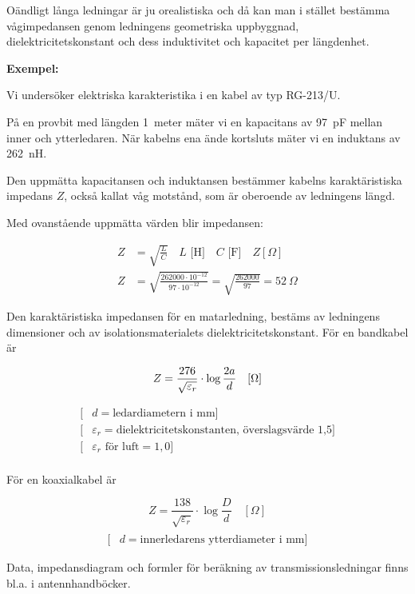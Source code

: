 Oändligt långa ledningar är ju orealistiska och då kan man i stället bestämma
vågimpedansen genom ledningens geometriska uppbyggnad, dielektricitetskonstant
och dess induktivitet och kapacitet per längdenhet.

\textbf{Exempel:}

Vi undersöker elektriska karakteristika i en kabel av typ RG-213/U.

På en provbit med längden 1~meter mäter vi en kapacitans av 97~pF
mellan inner och ytterledaren.
När kabelns ena ände kortsluts mäter vi en induktans av 262~nH.

Den uppmätta kapacitansen och induktansen bestämmer kabelns karaktäristiska
impedans \(Z\), också kallat våg motstånd, som är oberoende av ledningens längd.

Med ovanstående uppmätta värden blir impedansen:

\begin{align*}
  Z &= \sqrt{\frac{L}{C}} \quad L\text{ [H]} \quad C\text{ [F]} \quad
  Z[\Omega] \\
  Z &= \sqrt{\frac{262000\cdot 10^{-12}}{97\cdot 10^{-12}}} =
  \sqrt{\frac{262000}{97}} = 52\ \Omega
\end{align*}

Den karaktäristiska impedansen för en matarledning, bestäms av ledningens
dimensioner och av isolationsmaterialets dielektricitetskonstant.
För en bandkabel är

\[
Z = \frac{276}{\sqrt{\varepsilon_r}}\cdot\log\frac{2a}{d} \quad [\Omega] \\
\]
\begin{align*}
[&a = \text{centrumavståndet mellan ledarna i mm}] \\
[&d = \text{ledardiametern i mm}] \\
[&\varepsilon_r = \text{dielektricitetskonstanten, överslagsvärde 1,5}] \\
[&\varepsilon_r \text{ för luft} = 1,0] \\
\end{align*}

För en koaxialkabel är

\[
Z = \frac{138}{\sqrt{\varepsilon_r}}\cdot\log\frac{D}{d} \quad [\Omega]
\]
\begin{align*}
[&D = \text{ytterledarens innerdiameter i mm}] \\
[&d = \text{innerledarens ytterdiameter i mm}]
\end{align*}

Data, impedansdiagram och formler för beräkning av
transmissionsledningar finns bl.a. i antennhandböcker.

